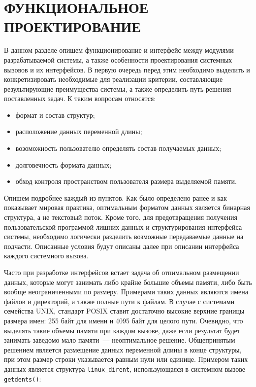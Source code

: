\section{ФУНКЦИОНАЛЬНОЕ ПРОЕКТИРОВАНИЕ}
\label{sec:func}

В данном разделе опишем функционирование и интерфейс между модулями
разрабатываемой системы, а также особенности проектирования системных вызовов и
их интерфейсов. В первую очередь перед этим необходимо выделить и
конкретизировать необходимые для реализации критерии, составляющие
результирующие преимущества системы, а также определить путь решения
поставленных задач. К таким вопросам относятся:

\begin{itemize}
\item формат и состав структур;
\item расположение данных переменной длины;
\item возоможность пользователю определять состав получаемых данных;
\item долговечность формата данных;
\item обход контроля пространством пользователя размера выделяемой памяти.
\end{itemize}

Опишем подробнее каждый из пунктов. Как было определено ранее и как показывает
мировая практика, оптимальным форматом данных является бинарная структура, а не
текстовый поток. Кроме того, для предотвращения получения пользовательской
программой лишних данных и структурирования интерфейса системы, необходимо
логически разделить возможные передаваемые данные на подчасти. Описанные условия
будут описаны далее при описании интерфейса каждого системного вызова.

Часто при разработке интерфейсов встает задача об отпимальном размещении данных,
которые могут занимать либо крайне большие объемы памяти, либо быть вообще
неограниченными по размеру. Примерами таких данных являются имена файлов и
директорий, а также полные пути к файлам. В случае с системами семейства UNIX,
стандарт POSIX ставит достаточно высокие верхние границы размера имен: 255 байт
для имени и 4095 байт для целого пути. Очевидно, что выделять такие объемы
памяти при каждом вызове, даже если результат будет занимать заведомо мало
памяти~--- неоптимальное решение. Общепринятым решением является размещение
данных переменной длины в конце структуры, при этом размер строки указывается
равным нули или единице. Примером таких данных является структура
\texttt{linux\_dirent}, использующаяся в системном вызове \texttt{getdents()}:

